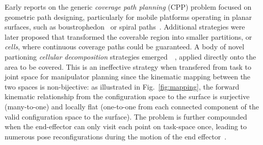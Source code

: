 \documentclass[conference]{IEEEtran}
\begin{document}



Early reports on the generic \textit{coverage path planning} (CPP) problem focused on geometric path designing, particularly for mobile platforms operating in planar surfaces, such as boustrophedon~\cite{choset1998coverage} or spiral paths~\cite{hassan2018a}. 
Additional strategies were later proposed that transformed the coverable region into smaller partitions, or \textit{cells}, where continuous coverage paths could be guaranteed. A body of novel partioning \textit{cellular decomposition} strategies emerged~\cite{choset2000exact}~\cite{huang2001optimal}, applied directly onto the area to be covered. This is an ineffective strategy when transfered from task to joint space for manipulator planning since the kinematic mapping between the two spaces is non-bijective: as illustrated in Fig.~\ref{fig:mapping}, the forward kinematic relationship from the configuration space to the surface is surjective (many-to-one) and locally flat (one-to-one from each connected component of the valid configuration space to the surface). 
The problem is further compounded when the end-effector can only visit each point on task-space once, leading to numerous pose reconfigurations during the motion of the end effector~\cite{rososhansky2011coverage}.
\end{document}
